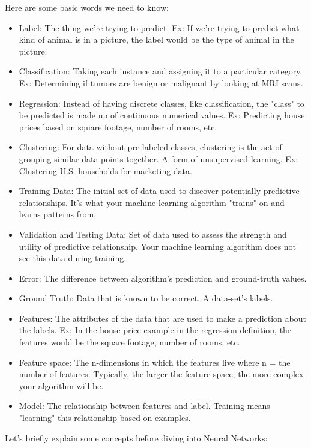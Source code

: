 Here are some basic words we need to know:
\begin{itemize}
	\item Label:
		The thing we're trying to predict. Ex: If we're trying to predict what kind of animal is in a picture, the label would be the type of animal in the picture.
	\item Classification:
		Taking each instance and assigning it to a particular category. Ex: Determining if tumors are benign or malignant by looking at MRI scans.
	\item Regression:
		Instead of having discrete classes, like classification, the "class" to be predicted is made up of continuous numerical values. Ex: Predicting house prices based on square footage, number of rooms, etc.
	\item Clustering:
		For data without pre-labeled classes, clustering is the act of grouping similar data points together. A form of unsupervised learning. Ex: Clustering U.S. households for marketing data.
	\item Training Data:
		The initial set of data used to discover potentially predictive relationships. It's what your machine learning algorithm "trains" on and learns patterns from.
	\item Validation and Testing Data:
		Set of data used to assess the strength and utility of predictive relationship. Your machine learning algorithm does not see this data during training.
	\item Error:
		The difference between algorithm's prediction and ground-truth values.
	\item Ground Truth:
		Data that is known to be correct. A data-set's labels.
	\item Features:
		The attributes of the data that are used to make a prediction about the labels. Ex: In the house price example in the regression definition, the features would be the square footage, number of rooms, etc.
	\item Feature space:
		The n-dimensions in which the features live where n = the number of features. Typically, the larger the feature space, the more complex your algorithm will be.
	\item Model:
		The relationship between features and label. Training means "learning" this relationship based on examples.


	
\end{itemize}
Let's briefly explain some concepts before diving into Neural Networks:

